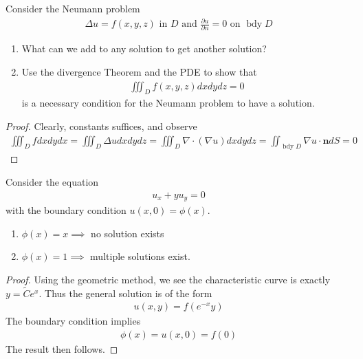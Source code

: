\documentclass{report}
\begin{document}
\begin{question}{}{}
Consider the Neumann problem 
\begin{align*}
\Delta u=f(x,y,z)\text{ in }D\text{ and } \frac{\partial u}{\partial n}=0\text{ on }\operatorname{bdy}D
\end{align*}
\begin{enumerate}[label=(\alph*)]
  \item What can we add to any solution to get another solution? 
  \item Use the divergence Theorem and the PDE to show that 
  \begin{align*}
  \iiint_D f(x,y,z)dxdydz=0
  \end{align*}
  is a necessary condition for the Neumann problem to have a solution. 
\end{enumerate}
\end{question}
\begin{proof}
Clearly, constants suffices, and observe 
\begin{align*}
\iiint_D fdxdydx=\iiint_D \Delta u dxdydz= \iiint_D \nabla \cdot (\nabla u)dxdydz = \iint_{\operatorname{bdy}D} \nabla u \cdot \textbf{n}dS= 0
\end{align*}
\end{proof}
\begin{question}{}{}
Consider the equation 
\begin{align*}
u_x+yu_y=0 
\end{align*}
with the boundary condition $u(x,0)=\phi (x)$. 
\begin{enumerate}[label=(\alph*)]
  \item $\phi (x)=x \implies $ no solution exists
  \item $\phi (x)=1 \implies $ multiple solutions exist.
\end{enumerate}
\end{question}
\begin{proof}
Using the geometric method, we see the characteristic curve is exactly $y=\tilde{C}e^x$. Thus the general solution is of the form 
\begin{align*}
u(x,y)=f(e^{-x}y)
\end{align*}
The boundary condition implies 
\begin{align*}
\phi (x)=u(x,0)=f(0)
\end{align*}
The result then follows. 
\end{proof}
\end{document}
